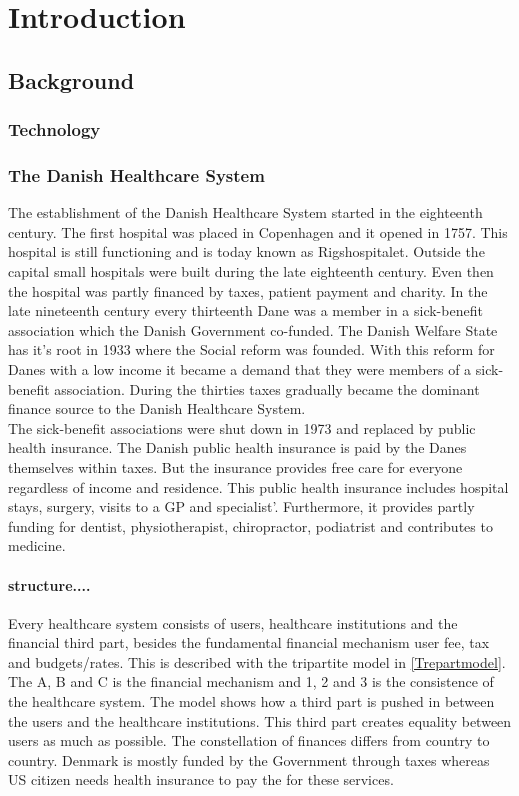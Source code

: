 \chapter{Introduction}

\section{Background}
\subsection{Technology}
\subsection{The Danish Healthcare System}



The establishment of the Danish Healthcare System started in the eighteenth century. The first hospital was placed in Copenhagen and it opened in 1757. This hospital is still functioning and is today known as Rigshospitalet. Outside the capital small hospitals were built during the late eighteenth century. Even then the hospital was partly financed by taxes, patient payment and charity. In the late nineteenth century every thirteenth Dane was a member in a sick-benefit association which the Danish Government co-funded. The Danish Welfare State has it's root in 1933 where the Social reform was founded. With this reform for Danes with a low income it became a demand that they were members of a sick-benefit association. During the thirties taxes gradually became the dominant finance source to the Danish Healthcare System.\\ 
The sick-benefit associations were shut down in 1973 and replaced by public health insurance. The Danish public health insurance is paid by the Danes themselves within taxes. But the insurance provides free care for everyone regardless of income and residence. This public health insurance includes hospital stays, surgery, visits to a GP and specialist'. Furthermore, it provides partly funding for dentist, physiotherapist, chiropractor, podiatrist and contributes to medicine.   \\
\subsubsection{structure....}
Every healthcare system consists of users, healthcare institutions and the financial third part, besides the fundamental financial mechanism user fee, tax and budgets/rates. This is described with the tripartite model in \cref{Trepartmodel}. The A, B and C is the financial mechanism and 1, 2 and 3 is the consistence of the healthcare system. The model shows how a third part is pushed in between the users and the healthcare institutions. This third part creates equality between users as much as possible. The constellation of finances differs from country to country. Denmark is mostly funded by the Government through taxes whereas US citizen needs health insurance to pay the for these services\cite{sundhedsvaesen}. \\


